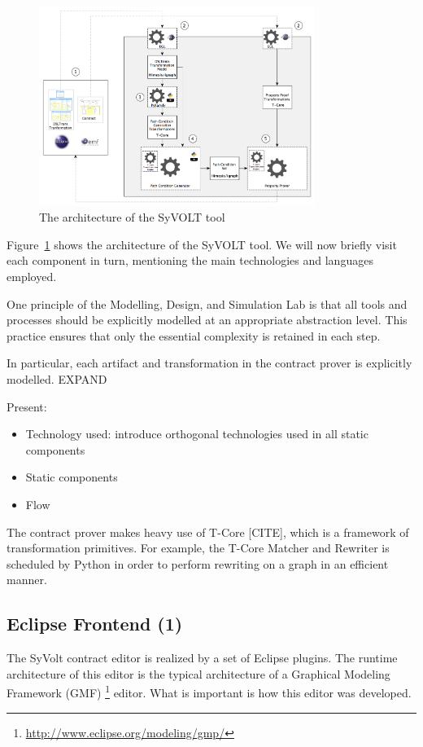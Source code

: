 \begin{figure}
\centering
\includegraphics[width=0.8\textwidth]{figures/syvolt_arch}
\caption{The architecture of the SyVOLT tool}
\label{fig:arch}
\end{figure}

Figure~\ref{fig:arch} shows the architecture of the SyVOLT tool. We will now briefly visit each component in turn, mentioning the main technologies and languages employed.


One principle of the Modelling, Design, and Simulation Lab is that all tools and processes should be explicitly modelled at an appropriate abstraction level. This practice ensures that only the essential complexity is retained in each step.

In particular, each artifact and transformation in the contract prover is explicitly modelled. EXPAND

Present:
\begin{itemize}
  \item Technology used: introduce orthogonal technologies used in all
  static components
  \item Static components
  \item Flow
\end{itemize}

The contract prover makes heavy use of T-Core [CITE], which is a framework of transformation primitives. For example, the T-Core Matcher and Rewriter is scheduled by Python in order to perform rewriting on a graph in an efficient manner.


\subsection{Eclipse Frontend (1)}

The SyVolt contract editor is realized by a set of Eclipse plugins.
The runtime architecture of this editor is the typical architecture of a Graphical Modeling Framework (GMF) \footnote{\url{http://www.eclipse.org/modeling/gmp/}} editor. 
What is important is how this editor was developed.

